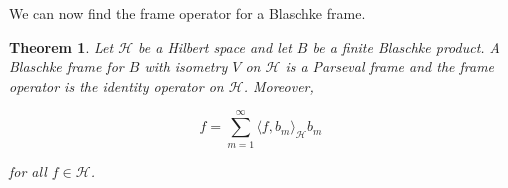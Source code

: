 \documentclass[10pt, reqno]{amsart}
\newtheorem{theorem}{Theorem}[section]
\theoremstyle{definition}
\numberwithin{equation}{section}
\begin{document}
We can now find the frame operator for a Blaschke frame.

\begin{theorem}\label{blaschkeframetheorem}
Let $\mathcal{H}$ be a Hilbert space and let $B$ be a finite Blaschke product. A Blaschke frame for $B$ with isometry $V$ on $\mathcal{H}$ is a Parseval frame and the frame operator is the identity operator on $\mathcal{H}$. Moreover, 

$$f=\sum_{m=1}^{\infty}\langle f,b_{m}\rangle_{\mathcal{H}}b_{m}$$

\noindent for all $f\in \mathcal{H}$.

\end{theorem}







\end{document}
